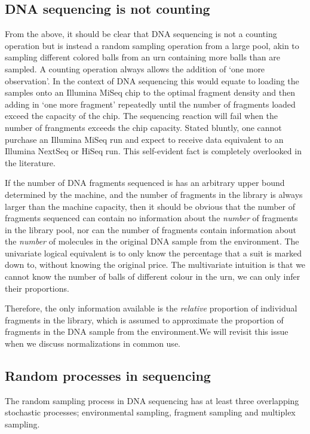 \documentclass[twocolumn]{article}
\begin{document}
\subsection{DNA sequencing is not
counting}\label{dna-sequencing-is-not-counting}

From the above, it should be clear that DNA sequencing is not a counting
operation but is instead a random sampling operation from a large pool,
akin to sampling different colored balls from an urn containing more
balls than are sampled. A counting operation always allows the addition
of `one more observation'. In the context of DNA sequencing this would
equate to loading the samples onto an Illumina MiSeq chip to the optimal
fragment density and then adding in `one more fragment' repeatedly until
the number of fragments loaded exceed the capacity of the chip. The
sequencing reaction will fail when the number of frangments exceeds the
chip capacity. Stated bluntly, one cannot purchase an Illumina MiSeq run
and expect to receive data equivalent to an Illumina NextSeq or HiSeq
run. This self-evident fact is completely overlooked in the literature.

If the number of DNA fragments sequenced is has an arbitrary upper bound
determined by the machine, and the number of fragments in the library is
always larger than the machine capacity, then it should be obvious that
the number of fragments sequenced can contain no information about the
\emph{number} of fragments in the library pool, nor can the number of
fragments contain information about the \emph{number} of molecules in
the original DNA sample from the environment. The univariate logical
equivalent is to only know the percentage that a suit is marked down to,
without knowing the original price. The multivariate intuition is that
we cannot know the number of balls of different colour in the urn, we
can only infer their proportions.

Therefore, the only information available is the \emph{relative}
proportion of individual fragments in the library, which is assumed to
approximate the proportion of fragments in the DNA sample from the
environment.We will revisit this issue when we discuss normalizations in
common use.

\subsection{Random processes in
sequencing}\label{random-processes-in-sequencing}

The random sampling process in DNA sequencing has at least three
overlapping stochastic processes; environmental sampling, fragment
sampling and multiplex sampling.
\end{document}
